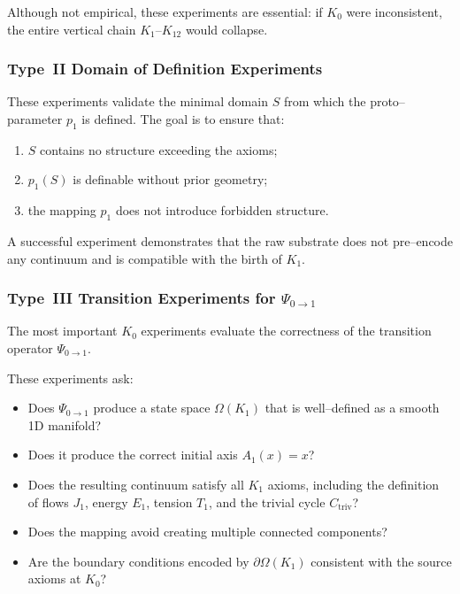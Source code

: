 Although not empirical, these experiments are essential:
if $K_0$ were inconsistent, the entire vertical chain $K_1$–$K_{12}$ would
collapse.


\subsubsection{Type~II Domain of Definition Experiments}

These experiments validate the minimal domain $S$ from which the
proto–parameter $p_1$ is defined.
The goal is to ensure that:

\begin{enumerate}
    \item $S$ contains no structure exceeding the axioms;
    \item $p_1(S)$ is definable without prior geometry;
    \item the mapping $p_1$ does not introduce forbidden structure.
\end{enumerate}

A successful experiment demonstrates that the raw substrate does not
pre–encode any continuum and is compatible with the birth of $K_1$.


\subsubsection{Type~III Transition Experiments for $\Psi_{0\to 1}$}

The most important $K_0$ experiments evaluate the correctness of the
transition operator $\Psi_{0\to 1}$.

These experiments ask:
\begin{itemize}
    \item Does $\Psi_{0\to 1}$ produce a state space $\Omega(K_1)$ that is
          well–defined as a smooth 1D manifold?
    \item Does it produce the correct initial axis $A_1(x)=x$?
    \item Does the resulting continuum satisfy all $K_1$ axioms, including
          the definition of flows $J_1$, energy $E_1$, tension $T_1$, and
          the trivial cycle $C_{\mathrm{triv}}$?
    \item Does the mapping avoid creating multiple connected components?
    \item Are the boundary conditions encoded by $\partial\Omega(K_1)$
          consistent with the source axioms at $K_0$?
\end{itemize}

